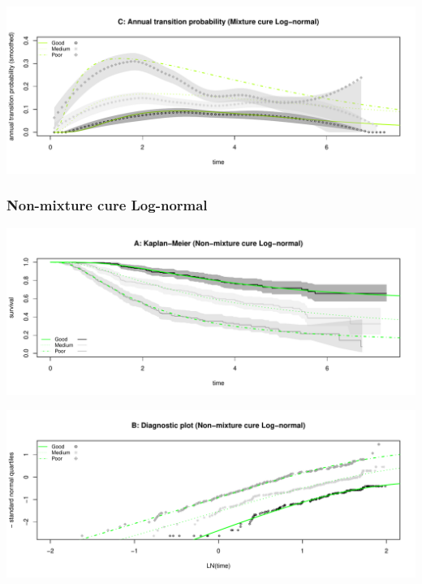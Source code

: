 \documentclass[
]{article}
\begin{document}
\begin{flushleft}\includegraphics[height=0.25\textheight]{BC_OS_output/Images/Figure_cure_models-9} \end{flushleft}

\clearpage

\subsubsection{Non-mixture cure
Log-normal}\label{non-mixture-cure-log-normal}

\begin{flushleft}\includegraphics[height=0.25\textheight]{BC_OS_output/Images/Figure_cure_models-10} \end{flushleft}

\begin{flushleft}\includegraphics[height=0.25\textheight]{BC_OS_output/Images/Figure_cure_models-11} \end{flushleft}
\end{document}
